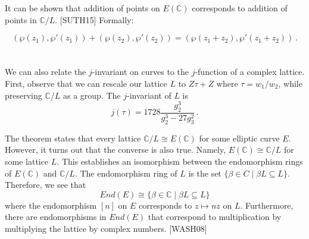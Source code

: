 \documentclass[12pt,twoside]{article}
\begin{document}
\noindent It can be shown that addition of points on $E(\mathbb C)$ corresponds to addition of points in $\mathbb C/L$. [SUTH15] Formally:

\begin{equation} 
\left( \wp(z_{1}), \wp'(z_{1}) \right) + \left( \wp(z_{2}), \wp'(z_{2}) \right) = \left( \wp(z_{1} + z_{2}), \wp'(z_{1} + z_{2}) \right) \, .
\end{equation} \\ \\
\noindent  We can also relate the $j$-invariant on curves to the $j$-function of a complex lattice. First, observe that we can rescale our lattice $L$ to $Z\tau + Z$ where $\tau = {w_{1}}/{w_{2}}$, while preserving $\mathbb C/L$ as a group. The $j$-invariant of $L$ is
\begin{equation}
j(\tau) = 1728 \frac{g_{2}^{3}}{g_{2}^{3} - 27 g_{3}^{2}} \, .
\end{equation} 

 
\noindent The theorem states that every lattice $\mathbb C/L \cong E(\mathbb C)$ for some elliptic curve $E$. However, it turns out that the converse is also true. Namely, $E(\mathbb C) \cong \mathbb C/L$ for some lattice $L$. This establishes an isomorphism between the endomorphism rings of $E(\mathbb C)$ and $\mathbb C/L$. The endomorphism ring of $L$ is the set $\{ \beta \in C \mid \beta L \subseteq L \}$. Therefore, we see that
\begin{equation}
End(E) \cong \{ \beta \in \mathbb C \mid \beta L \subseteq L \} 
\end{equation}  
where the endomorphism $[n]$ on $E$ corresponds to $z \mapsto nz$ on $L$. Furthermore, there are endomorphisms in $End(E)$ that correspond to multiplication by multiplying the lattice by complex numbers. [WASH08]

\end{document}
